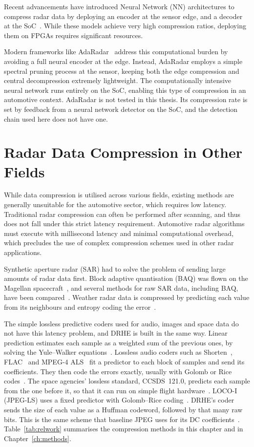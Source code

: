 Recent advancements have introduced Neural Network (NN) architectures to compress radar data by deploying an encoder at the sensor edge, and a decoder at the SoC~\cite{yao2023,hu2023}. While these models achieve very high compression ratios, deploying them on FPGAs requires significant resources.

Modern frameworks like AdaRadar~\cite{park2026} address this computational burden by avoiding a full neural encoder at the edge. Instead, AdaRadar employs a simple spectral pruning process at the sensor, keeping both the edge compression and central decompression extremely lightweight. The computationally intensive neural network runs entirely on the SoC, enabling this type of compression in an automotive context.
AdaRadar is not tested in this thesis. Its compression rate is set by feedback
from a neural network detector on the SoC, and the detection chain used here
does not have one.

\section{Radar Data Compression in Other Fields}
\label{sec:sota}
\label{sec:kiem}

While data compression is utilised across various fields, existing methods are generally unsuitable for the automotive sector, which requires low latency. Traditional radar compression can often be performed after scanning, and thus does not fall under this strict latency requirement. Automotive radar algorithms must execute with millisecond latency and minimal computational overhead, which precludes the use of complex compression schemes used in other radar applications.

Synthetic aperture radar (SAR) had to solve the problem of sending large
amounts of radar data first. Block adaptive quantisation (BAQ) was flown on the
Magellan spacecraft~\cite{kwok1989}, and several methods for raw SAR data,
including BAQ, have been compared~\cite{benz1995}. Weather radar data is
compressed by predicting each value from its neighbours and entropy coding the
error~\cite{zeng2018}.

The simple lossless predictive coders used for audio, images and space data do
not have this latency problem, and DRHE is built in the same way. Linear
prediction estimates each sample as a weighted sum of the previous ones, by
solving the Yule--Walker equations~\cite{makhoul1975}. Lossless audio coders
such as Shorten~\cite{robinson1994}, FLAC~\cite{rfc9639} and MPEG-4
ALS~\cite{liebchen2004} fit a predictor to each block of samples and send its
coefficients. They then code the errors exactly, usually with Golomb or Rice
codes~\cite{golomb1966,rice1979}. The space agencies' lossless standard,
CCSDS~121.0, predicts each sample from the one before it, so that it can run
on simple flight hardware~\cite{ccsds121}. LOCO-I (JPEG-LS) uses a fixed
predictor with Golomb--Rice coding~\cite{weinberger2000}. DRHE's coder sends
the size of each value as a Huffman codeword, followed by that many raw bits.
This is the same scheme that baseline JPEG uses for its DC
coefficients~\cite{itut81}. Table~\ref{tab:relwork} summarises the
compression methods in this chapter and in Chapter~\ref{ch:methods}.

